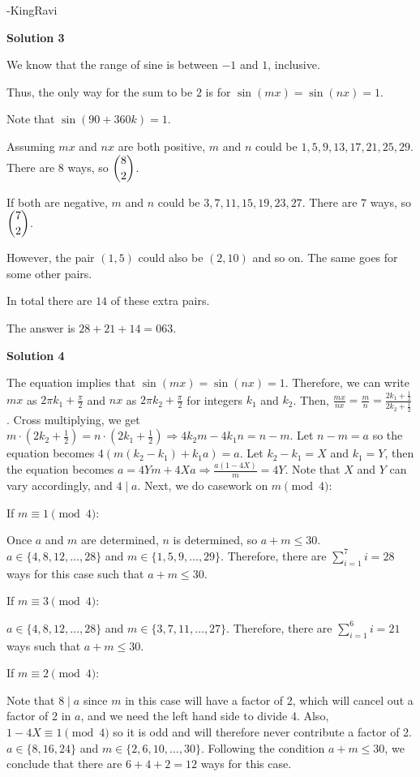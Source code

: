 \begin{enumerate}
 -KingRavi

 



\textbf{Solution 3}

We know that the range of sine is between $-1$ and $1$, inclusive.

 Thus, the only way for the sum to be $2$ is for $\sin(mx)=\sin(nx)=1$.

 Note that $\sin(90+360k)=1$.

 Assuming $mx$ and $nx$ are both positive, $m$ and $n$ could be $1,5,9,13,17,21,25,29$. There are $8$ ways, so $\dbinom{8}{2}$.

 If both are negative, $m$ and $n$ could be $3,7,11,15,19,23,27$. There are $7$ ways, so $\dbinom{7}{2}$.

 However, the pair $(1,5)$ could also be $(2, 10)$ and so on. The same goes for some other pairs.

 In total there are $14$ of these extra pairs.

 The answer is $28+21+14 = \boxed{063}$.

 



\textbf{Solution 4}

The equation implies that $\sin(mx)=\sin(nx)=1$. Therefore, we can write $mx$ as $2{\pi}k_1+\frac{\pi}{2}$ and $nx$ as $2{\pi}k_2+\frac{\pi}{2}$ for integers $k_1$ and $k_2$. Then, $\frac{mx}{nx}=\frac{m}{n}=\frac{2k_1+\frac{1}{2}}{2k_2+\frac{1}{2}}$. Cross multiplying, we get $m\cdot{(2k_2+\frac{1}{2})}=n\cdot{(2k_1+\frac{1}{2})} \Longrightarrow 4k_2m-4k_1n=n-m$. Let $n-m=a$ so the equation becomes $4(m(k_2-k_1)+k_1a)=a$. Let $k_2-k_1=X$ and $k_1=Y$, then the equation becomes $a=4Ym+4Xa \Longrightarrow \frac{a(1-4X)}{m}=4Y$. Note that $X$ and $Y$ can vary accordingly, and $4\mid{a}$. Next, we do casework on $m\pmod{4}$:

 If $m\equiv 1\pmod{4}$:

 Once $a$ and $m$ are determined, $n$ is determined, so $a+m\leq30$. $a\in \{4,8,12,\dots,28\}$ and $m\in \{1,5,9,\dots,29\}$. Therefore, there are $\sum_{i=1}^{7}{i}=28$ ways for this case such that $a+m\leq30$.

 If $m\equiv 3\pmod{4}$:

 $a\in \{4,8,12,\dots,28\}$ and $m\in \{3,7,11,\dots,27\}$. Therefore, there are $\sum_{i=1}^{6}{i}=21$ ways such that $a+m\leq30$.

 If $m\equiv 2\pmod{4}$:

 Note that $8\mid{a}$ since $m$ in this case will have a factor of 2, which will cancel out a factor of 2 in $a$, and we need the left hand side to divide 4. Also, $1-4X\equiv 1\pmod{4}$ so it is odd and will therefore never contribute a factor of 2. $a\in \{8,16,24\}$ and $m\in \{2,6,10,\dots,30\}$. Following the condition $a+m\leq30$, we conclude that there are $6+4+2=12$ ways for this case.


\end{enumerate}
